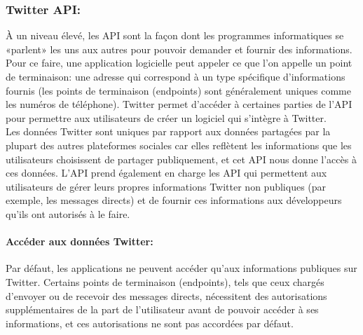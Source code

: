 \subsubsection{Twitter API:}
À un niveau élevé, les API sont la façon dont les programmes informatiques se «parlent» les uns aux autres pour pouvoir demander et fournir des informations. Pour ce faire, une application logicielle peut appeler ce que l'on appelle un point de terminaison:
une adresse qui correspond à un type spécifique d'informations fournis (les points de terminaison (endpoints) sont généralement uniques comme les numéros de téléphone).
Twitter permet d'accéder à certaines parties de l'API pour permettre aux utilisateurs de créer un logiciel qui s'intègre à Twitter.\cite{twitterAPI} \\

Les données Twitter sont uniques par rapport aux données partagées par la plupart des autres plateformes sociales car elles reflètent les informations que les utilisateurs choisissent de partager publiquement, et cet API nous donne l'accès à ces données.
L'API prend également en charge les API qui permettent aux utilisateurs de gérer leurs propres informations Twitter non publiques (par exemple, les messages directs) et de fournir ces informations aux développeurs qu'ils ont autorisés à le faire.
\paragraph{Accéder aux données Twitter:} 
Par défaut, les applications ne peuvent accéder qu'aux informations publiques sur Twitter. Certains points de terminaison (endpoints), tels que ceux chargés d'envoyer ou de recevoir des messages directs, nécessitent des autorisations supplémentaires de la part de l'utilisateur avant de pouvoir accéder à ses informations, et ces autorisations ne sont pas accordées par défaut. \\

